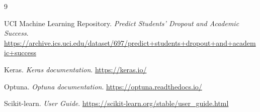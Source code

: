 \documentclass[11pt,a4paper]{article}
\begin{document}
\begin{thebibliography}{9}

UCI Machine Learning Repository.
\emph{Predict Students' Dropout and Academic Success}.
\url{https://archive.ics.uci.edu/dataset/697/predict+students+dropout+and+academic+success}

Keras.
\emph{Keras documentation}.
\url{https://keras.io/}

Optuna.
\emph{Optuna documentation}.
\url{https://optuna.readthedocs.io/}

Scikit-learn.
\emph{User Guide}.
\url{https://scikit-learn.org/stable/user_guide.html}

\end{thebibliography}
\end{document}
